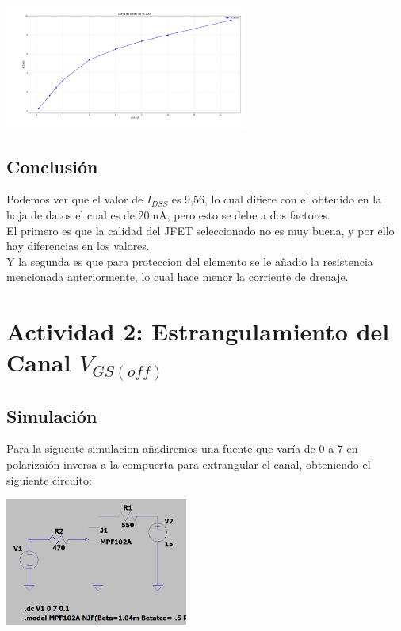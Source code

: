 \vspace{0.1cm}

\includegraphics[width=8cm]{./imagenes/graficap1.png}

\subsection{Conclusión}

Podemos ver que el valor de $I_{DSS}$ es 9,56, lo cual difiere con el obtenido en la hoja de datos el cual es de 20mA, pero esto se debe a dos factores.\\
El primero es que la calidad del JFET seleccionado no es muy buena, y por ello hay diferencias en los valores.\\
Y la segunda es que para proteccion del elemento se le añadio la resistencia mencionada anteriormente, lo cual hace menor la corriente de drenaje.

\section{Actividad 2: Estrangulamiento del Canal $V_{GS(off)}$}

\subsection{Simulación}

Para la siguente simulacion añadiremos una fuente que varía de 0 a 7 en polarizaión inversa a la compuerta para extrangular el canal, obteniendo el siguiente circuito:

\includegraphics[width=6cm]{./imagenes/Circ2.png}

